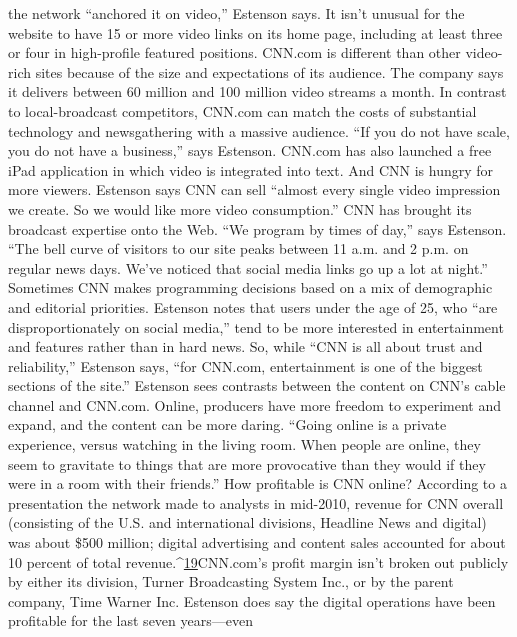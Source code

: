 the network ``anchored it on video,'' Estenson says. It isn’t unusual for the website
to have 15 or more video links on its home page, including at least three or four
in high-profile featured positions.
CNN.com is different than other video-rich sites because of the size and expectations
of its audience. The company says it delivers between 60 million and
100 million video streams a month. In contrast to local-broadcast competitors,
CNN.com can match the costs of substantial technology and newsgathering
with a massive audience. ``If you do not have scale, you do not have a business,''
says Estenson. CNN.com has also launched a free iPad application in which
video is integrated into text. And CNN is hungry for more viewers. Estenson
says CNN can sell ``almost every single video impression we create. So we would
like more video consumption.''
CNN has brought its broadcast expertise onto the Web. ``We program by times
of day,'' says Estenson. ``The bell curve of visitors to our site peaks between 11
a.m. and 2 p.m. on regular news days. We’ve noticed that social media links go up
a lot at night.'' Sometimes CNN makes programming decisions based on a mix
of demographic and editorial priorities. Estenson notes that users under the age
of 25, who ``are disproportionately on social media,'' tend to be more interested
in entertainment and features rather than in hard news. So, while ``CNN is all
about trust and reliability,'' Estenson says, ``for CNN.com, entertainment is one
of the biggest sections of the site.''
Estenson sees contrasts between the content on CNN’s cable channel and
CNN.com. Online, producers have more freedom to experiment and expand,
and the content can be more daring. ``Going online is a private experience, versus
watching in the living room. When people are online, they seem to gravitate to
things that are more provocative than they would if they were in a room with
their friends.''
How profitable is CNN online? According to a presentation the network made
to analysts in mid-2010, revenue for CNN overall (consisting of the U.S. and international
divisions, Headline News and digital) was about \$500 million; digital
advertising and content sales accounted for about 10 percent of total revenue.^{\href{#endnotes-ch4}{19}}CNN.com’s profit margin isn’t broken out publicly by either its division, Turner
Broadcasting System Inc., or by the parent company, Time Warner Inc. Estenson
does say the digital operations have been profitable for the last seven years—even

